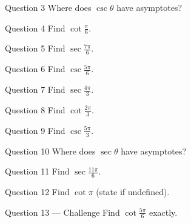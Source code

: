 \documentclass[11pt]{article}
\begin{document}
\begin{qbox}{Question 3}
Where does $\csc\theta$ have asymptotes?\workspace{2.4cm}
\end{qbox}

\begin{qbox}{Question 4}
Find $\cot\tfrac{\pi}{6}$.\workspace{2.4cm}
\end{qbox}

\begin{qbox}{Question 5}
Find $\sec\tfrac{7\pi}{6}$.\workspace{2.4cm}
\end{qbox}

\begin{qbox}{Question 6}
Find $\csc\tfrac{5\pi}{6}$.\workspace{2.4cm}
\end{qbox}

\begin{qbox}{Question 7}
Find $\sec\tfrac{4\pi}{3}$.\workspace{2.4cm}
\end{qbox}

\begin{qbox}{Question 8}
Find $\cot\tfrac{2\pi}{3}$.\workspace{2.4cm}
\end{qbox}

\begin{qbox}{Question 9}
Find $\csc\tfrac{5\pi}{3}$.\workspace{2.4cm}
\end{qbox}

\begin{qbox}{Question 10}
Where does $\sec\theta$ have asymptotes?\workspace{2.4cm}
\end{qbox}

\begin{qbox}{Question 11}
Find $\sec\tfrac{11\pi}{6}$.\workspace{2.4cm}
\end{qbox}

\begin{qbox}{Question 12}
Find $\cot\pi$ (state if undefined).\workspace{2.4cm}
\end{qbox}

\begin{qbox}{Question 13 --- Challenge}
Find $\cot\tfrac{5\pi}{6}$ exactly.\workspace{2.6cm}
\end{qbox}

\clearpage
{}
\end{document}
